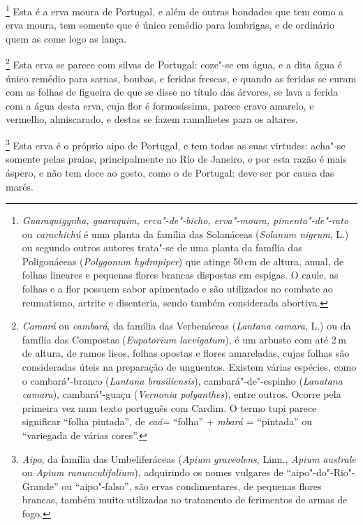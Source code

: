 \begin{linenumbers}
\footnote{ \textit{Guaraquigynha, guaraquim,
erva"-de"-bicho, erva"-moura, pimenta"-de"-rato} ou \textit{carachichú} 
é uma planta da família das Solanáceas (\textit{Solanum nigrum}, L.) ou
segundo outros autores trata"-se de uma planta da família das
Poligonáceas (\textit{Polygonum hydropiper}) que atinge 50\,cm de
altura, anual, de folhas lineares e pequenas flores brancas dispostas
em espigas. O caule, as folhas e a flor possuem sabor apimentado e são
utilizados no combate ao reumatismo, artrite e disenteria, sendo também
considerada abortiva.} Esta é a erva moura de Portugal, e
além de outras bondades que tem como a erva moura, tem somente que é
único remédio para lombrigas, e de ordinário quem as come logo as lança. 

\footnote{ \textit{Camará} ou \textit{cambará}, da
família das Verbenáceas (\textit{Lantana camara}, L.) ou da família das
Compostas (\textit{Eupatorium laevigatum}), é um arbusto com até 2\,m de
altura, de ramos lisos, folhas opostas e flores amareladas, cujas
folhas são consideradas úteis na preparação de unguentos. Existem várias
espécies, como o cambará"-branco (\textit{Lantana brasiliensis}), 
cambará"-de"-espinho (\textit{Lanatana camara}), cambará"-guaçu
(\textit{Vernonia polyanthes}), entre outros. Ocorre pela primeira vez
num texto português com Cardim. O termo tupi parece significar ``folha
pintada'', de \textit{caá=} ``folha'' + \textit{mbará} = ``pintada'' ou 
``variegada de várias cores''.} Esta erva se parece com silvas
de Portugal: coze"-se em água, e a dita água é único remédio para
sarnas, boubas, e feridas frescas, e quando as feridas se curam com as
folhas de figueira de que se disse no título das árvores, se lava a
ferida com a água desta erva, cuja flor é formosíssima, parece cravo
amarelo, e vermelho, almiscarado, e destas se fazem ramalhetes para os altares.

\footnote{ \textit{Aipo}, da família das Umbeliferáceas
(\textit{Apium graveolens}, Linn., \textit{Apium australe} ou
\textit{Apium ranunculifolium}), adquirindo os nomes vulgares de
``aipo"-do"-Rio"-Grande'' ou ``aipo"-falso'', são ervas condimentares, de
pequenas flores brancas, também muito utilizadas no tratamento de
ferimentos de armas de fogo.} Esta erva é o próprio aipo
de Portugal, e tem todas as suas virtudes: acha"-se somente pelas
praias, principalmente no Rio de Janeiro, e por esta razão é mais
áspero, e não tem doce ao gosto, como o de Portugal: deve ser por causa
das marés. 


\end{linenumbers}
